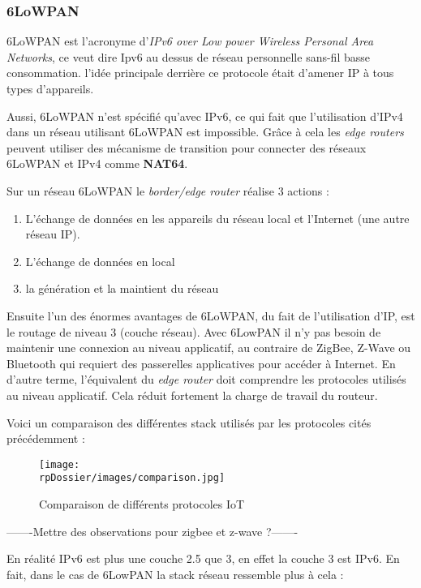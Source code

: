 \subsubsection{6LoWPAN}

6LoWPAN est l'acronyme d'\textit{IPv6 over Low power Wireless Personal Area Networks}, ce veut dire Ipv6 au dessus de réseau personnelle sans-fil basse consommation. l'idée principale derrière ce protocole était d'amener IP à tous types d'appareils. 

Aussi, 6LoWPAN n'est spécifié qu'avec IPv6, ce qui fait que l'utilisation d'IPv4 dans un réseau utilisant 6LoWPAN est impossible. Grâce à cela les \textit{edge routers} peuvent utiliser des mécanisme de transition pour connecter des réseaux 6LoWPAN et IPv4 comme \textbf{NAT64}.

Sur un réseau 6LoWPAN le \textit{border/edge router} réalise 3 actions :

\begin{enumerate}
\item L'échange de données en les appareils du réseau local et l'Internet (une autre réseau IP).
\item L'échange de données en local
\item la génération et la maintient du réseau
\end{enumerate}

Ensuite l'un des énormes avantages de 6LoWPAN, du fait de l'utilisation d'IP, est le routage de niveau 3 (couche réseau). Avec 6LowPAN il n'y pas besoin de maintenir une connexion au niveau applicatif, au contraire de ZigBee, Z-Wave ou Bluetooth qui requiert des passerelles applicatives pour accéder à Internet. En d'autre terme, l'équivalent du \textit{edge router} doit comprendre les protocoles utilisés au niveau applicatif. Cela réduit fortement la charge de travail du routeur.

Voici un comparaison des différentes stack utilisés par les protocoles cités précédemment : 

\begin{figure}[H]
\centering
\texttt{[image: \\rpDossier/images/comparison.jpg]}
\caption{Comparaison de différents protocoles IoT}
\label{comparison}
\end{figure}

-------Mettre des observations pour zigbee et z-wave ?-------

En réalité IPv6 est plus une couche 2.5 que 3, en effet la couche 3 est IPv6. En fait, dans le cas de 6LowPAN la stack réseau ressemble plus à cela :

